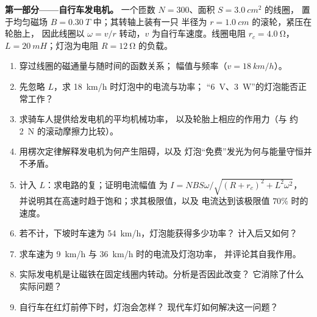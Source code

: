 \begin{problem}
\label{pb:b1:induction:1}

\medskip
\noindent\textbf{第一部分——自行车发电机。}
一个匝数 $N = 300$、面积 $S = \qty{3.0}{cm^2}$ 的线圈，
置于均匀磁场 $B = \qty{0.30}{T}$ 中；其转轴上装有一只
半径为 $r = \qty{1.0}{cm}$ 的滚轮，紧压在轮胎上，
因此线圈以 $\omega = v/r$ 转动，$v$ 为自行车速度。线圈电阻 $r_c = \qty{4.0}{\ohm}$，
 $L = \qty{20}{mH}$；灯泡为电阻 $R = \qty{12}{\ohm}$ 的负载。
\begin{enumerate}
  \item 穿过线圈的磁通量与随时间的函数关系；
        幅值与频率（$v = \qty{18}{km/h}$）。
  \item 先忽略 $L$，求 \qty{18}{km/h} 时灯泡中的电流与功率；
        “\qty{6}{V}、\qty{3}{W}”的灯泡能否正常工作？
  \item 求骑车人提供给发电机的平均机械功率，
        以及轮胎上相应的作用力（与
        约 \qty{2}{N} 的滚动摩擦力比较）。
  \item 用楞次定律解释发电机为何产生阻碍，以及
        灯泡“免费”发光为何与能量守恒并不矛盾。
  \item 计入 $L$：求电路的复；证明电流幅值
        为 $I = NBS\omega/\sqrt{(R + r_c)^2 + L^2\omega^2}$，
        并说明其在高速时趋于饱和；求其极限值，以及
        电流达到该极限值 $70\%$ 时的速度。
  \item 若不计，下坡时车速为 \qty{54}{km/h}，灯泡能获得多少功率？
        计入后又如何？
  \item 求车速为 \qty{9}{km/h} 与 \qty{36}{km/h} 时的电流及灯泡功率，
        并评论其自我作用。
  \item 实际发电机是让磁铁在固定线圈内转动。分析是否因此改变？
        它消除了什么实际问题？
  \item 自行车在红灯前停下时，灯泡会怎样？
        现代车灯如何解决这一问题？
\end{enumerate}


\end{problem}

